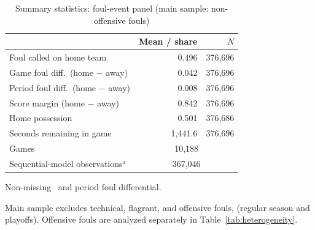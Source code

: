 \begin{table}[htbp]
\centering
\caption{Summary statistics: foul-event panel (main sample: non-offensive fouls)}
\label{tab:summary}
\begin{threeparttable}
\small
\begin{tabular}{lrr}
\toprule
 & Mean / share & $N$ \\
\midrule
Foul called on home team & 0.496 & 376,696 \\
Game foul diff.\ (home $-$ away) & 0.042 & 376,696 \\
Period foul diff.\ (home $-$ away) & 0.008 & 376,696 \\
Score margin (home $-$ away) & 0.842 & 376,696 \\
Home possession & 0.501 & 376,686 \\
Seconds remaining in game & 1,441.6 & 376,696 \\
\midrule
Games & \multicolumn{2}{c}{10,188} \\
Sequential-model observations$^{\mathrm{a}}$ & \multicolumn{2}{c}{367,046} \\
\bottomrule
\end{tabular}
\begin{tablenotes}[flushleft]
\small
\item[$^{\mathrm{a}}$] Non-missing \foullast\ and period foul differential.
\item[] Main sample excludes technical, flagrant, and offensive fouls, \sampleseasons{} (regular season and playoffs). Offensive fouls are analyzed separately in Table~\ref{tab:heterogeneity}.
\end{tablenotes}
\end{threeparttable}
\end{table}
